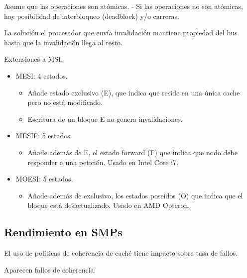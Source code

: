 \documentclass[12pt, twoside, openright]{report} %
\begin{document}
Asume que las operaciones son atómicas. - Si las operaciones no
son atómicas, hay posibilidad de interbloqueo (deadblock) y/o
carreras.

La solución el procesador que envía invalidación mantiene
propiedad del bus hasta que la invalidación llega al resto.

Extensiones a MSI:

\begin{itemize}

	\item MESI: 4 estados.

	      \begin{itemize}

		      \item Añade estado exclusivo (E), que indica que reside en una única
		            cache pero no está modificado.
		      \item Escritura de un bloque E no genera invalidaciones.
	      \end{itemize}
	\item MESIF: 5 estados.

	      \begin{itemize}

		      \item Añade además de E, el estado forward (F) que indica que nodo
		            debe responder a una petición. Usado en Intel Core i7.
	      \end{itemize}
	\item MOESI: 5 estados.

	      \begin{itemize}

		      \item Añade además de exclusivo, los estados poseídos (O) que indica
		            que el bloque está desactualizado. Usado en AMD Opteron.
	      \end{itemize}
\end{itemize}

\subsection{Rendimiento en SMPs}


El uso de políticas de coherencia de caché tiene impacto sobre
tasa de fallos.

Aparecen fallos de coherencia:
\end{document}
